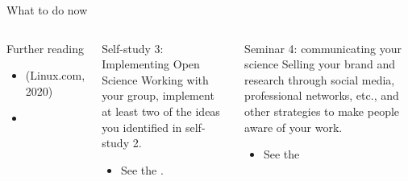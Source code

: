 
\begin{frame}{What to do now}

	\begin{columns}[t]
		
		\begin{block}{Further reading}
		\begin{itemize}
		    \item {} (Linux.com, 2020)
		    \item {}
		\end{itemize}
		\end{block}
		
		\begin{block}{Self-study 3: Implementing Open Science}
			Working with your group, implement at least two of the ideas you identified in self-study 2.
			\begin{itemize}
			    \item See the .
			\end{itemize}
		\end{block}

		\begin{block}{Seminar 4: communicating your science}
			Selling your brand and research through social media, professional networks, etc., and other strategies to make people aware of your work.
			\begin{itemize}
				\item See the 
			\end{itemize}
		\end{block}

	\end{columns}

\end{frame}

